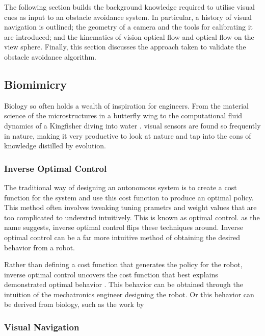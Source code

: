 \documentclass{UoNMCHA}
\numberwithin{equation}{section}
\begin{document}
The following section builds the background knowledge required to utilise visual cues as input to an obstacle avoidance system. In particular, a history of visual navigation is outlined;  the geometry of a camera and the tools for calibrating it are introduced; and the kinematics of vision optical flow and optical flow on the view sphere. Finally, this section discusses the approach taken to validate the obstacle avoidance algorithm.


\subsection{Biomimicry} %
Biology so often holds a wealth of inspiration for engineers. From the material science of the microstructures in a butterfly wing to the computational fluid dynamics of a Kingfisher diving into water \citep{benyus1997biomimicry}. visual sensors are found so frequently in nature, making it very productive to look at nature and tap into the eons of knowledge distilled by evolution.

\subsubsection{Inverse Optimal Control}
The traditional way of designing an autonomous system is to create a cost function for the system and use this cost function to produce an optimal policy. This method often involves tweaking tuning prametrs and weight values that are too complicated to understnd intuitively. This is known as optimal control. as the name suggests, inverse optimal control flips these techniques around. Inverse optimal control can be a far more intuitive method of obtaining the desired behavior from a robot.

Rather than defining a cost function that generates the policy for the robot, inverse optimal control uncovers the cost function that best explains demonstrated optimal behavior \citep{ratliffinverse}. This behavior can be obtained through the intuition of the mechatronics engineer designing the robot. Or this behavior can be derived from biology, such as the work by 
\subsubsection{Visual Navigation}
\end{document}
